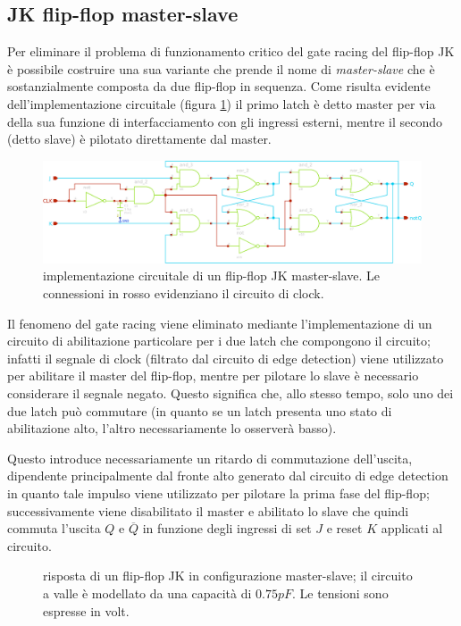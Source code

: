 \subsection*{JK flip-flop master-slave}
	
	Per eliminare il problema di funzionamento critico del gate racing del flip-flop JK è possibile costruire una sua variante che prende il nome di \textit{master-slave} che è sostanzialmente composta da due flip-flop in sequenza. Come risulta evidente dell'implementazione circuitale (figura \ref{fig:jkff:masterslave}) il primo latch è detto master per via della sua funzione di interfacciamento con gli ingressi esterni, mentre il secondo (detto slave) è pilotato direttamente dal master.
	
	\begin{figure}[bht]
		\centering
		\includegraphics[width=12cm]{Immagini/jk-masterslave}
		\caption{implementazione circuitale di un flip-flop JK master-slave. Le connessioni in rosso evidenziano il circuito di clock.}
		\label{fig:jkff:masterslave}
	\end{figure}
	
	Il fenomeno del gate racing viene eliminato mediante l'implementazione di un circuito di abilitazione particolare per i due latch che compongono il circuito; infatti il segnale di clock (filtrato dal circuito di edge detection) viene utilizzato per abilitare il master del flip-flop, mentre per pilotare lo slave è necessario considerare il segnale negato. Questo significa che, allo stesso tempo, solo uno dei due latch può commutare (in quanto se un latch presenta uno stato di abilitazione alto, l'altro necessariamente lo osserverà basso).
	
	Questo introduce necessariamente un ritardo di commutazione dell'uscita, dipendente principalmente dal fronte alto generato dal circuito di edge detection in quanto tale impulso viene utilizzato per pilotare la prima fase del flip-flop; successivamente viene disabilitato il master e abilitato lo slave che quindi commuta l'uscita $Q$ e $\overline Q$ in funzione degli ingressi di set $J$ e reset $K$ applicati al circuito.
	
	
	\begin{figure}[bht]
		\centering
		
		\caption{risposta di un flip-flop JK in configurazione master-slave; il circuito a valle è modellato da una capacità di $0.75pF$. Le tensioni sono espresse in volt.}
		\label{fig:jkff:sim-masterslave}
	\end{figure}
	
